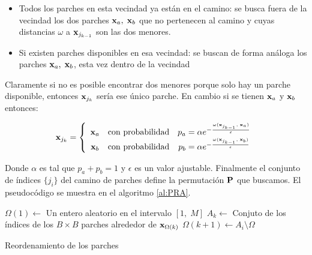 \begin{itemize}
\item Todos los parches en esta vecindad ya están en el camino: se busca fuera de la vecindad los dos parches $\x_a,\; \x_b$ que no pertenecen al camino y cuyas distancias $\omega$ a $\x_{j_{k - 1}}$ son las dos menores.

\item Si existen parches disponibles en esa vecindad: se buscan de forma an\'aloga los parches $\x_a,\; \x_b$, esta vez dentro de la vecindad
\end{itemize}

Claramente si no es posible encontrar dos menores porque solo hay un parche disponible, entonces $\x_{j_k}$ ser\'ia ese \'unico parche. En cambio si se tienen $\x_a$ y $\x_b$ entonces:

\begin{equation}
	\x_{j_k} = \left\{
		\begin{array}{ccc}
		\x_a &\mbox{con probabilidad}& p_a = \alpha e^{-\frac{\omega(\x_{j_{k - 1}},\; \x_a)}{\epsilon}}\\
		\x_b &\mbox{con probabilidad}& p_b = \alpha e^{-\frac{\omega(\x_{j_{k - 1}},\; \x_b)}{\epsilon}}\\
		\end{array}
	\right.
\end{equation}

Donde $\alpha$ es tal que $p_a + p_b = 1$ y $\epsilon$ es un valor ajustable. Finalmente el conjunto de \'indices $\{j_i\}$ del camino de parches define la permutaci\'on $\P$ que buscamos. El pseudoc\'odigo se muestra en el algoritmo \ref{al:PRA}.

\begin{algorithm}
	\DontPrintSemicolon %
	$\Omega(1) \gets$ Un entero aleatorio en el intervalo $[1,\; M]$\;
	 {
		$A_k \gets $ Conjuto de los \'indices de los $B \times B$ parches alrededor de $\x_{\Omega(k)}$\;
		 {
			$\Omega(k + 1) \gets A_i \setminus \Omega$\;
		}
	}
	\Return{$\Omega$}\;
	\caption{Reordenamiento de los parches}
	\label{al:PRA}
\end{algorithm}

